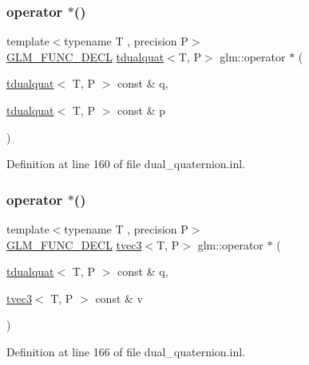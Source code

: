 \subsubsection{\texorpdfstring{operator $\ast$()}{operator *()}\hspace{0.1cm}{\footnotesize\ttfamily [1/7]}}
{\footnotesize\ttfamily template$<$typename T , precision P$>$ \\
\mbox{\hyperlink{setup_8hpp_ab2d052de21a70539923e9bcbf6e83a51}{G\+L\+M\+\_\+\+F\+U\+N\+C\+\_\+\+D\+E\+CL}} \mbox{\hyperlink{structglm_1_1tdualquat}{tdualquat}}$<$T, P$>$ glm\+::operator $\ast$ (\begin{DoxyParamCaption}\item[{\mbox{\hyperlink{structglm_1_1tdualquat}{tdualquat}}$<$ T, P $>$ const \&}]{q,  }\item[{\mbox{\hyperlink{structglm_1_1tdualquat}{tdualquat}}$<$ T, P $>$ const \&}]{p }\end{DoxyParamCaption})}



Definition at line 160 of file dual\+\_\+quaternion.\+inl.

\mbox{\label{group__gtx__dual__quaternion_gaf6c5a7a17854cbb1c8e6e34cc494f7af}} 
\subsubsection{\texorpdfstring{operator $\ast$()}{operator *()}\hspace{0.1cm}{\footnotesize\ttfamily [2/7]}}
{\footnotesize\ttfamily template$<$typename T , precision P$>$ \\
\mbox{\hyperlink{setup_8hpp_ab2d052de21a70539923e9bcbf6e83a51}{G\+L\+M\+\_\+\+F\+U\+N\+C\+\_\+\+D\+E\+CL}} \mbox{\hyperlink{structglm_1_1tvec3}{tvec3}}$<$T, P$>$ glm\+::operator $\ast$ (\begin{DoxyParamCaption}\item[{\mbox{\hyperlink{structglm_1_1tdualquat}{tdualquat}}$<$ T, P $>$ const \&}]{q,  }\item[{\mbox{\hyperlink{structglm_1_1tvec3}{tvec3}}$<$ T, P $>$ const \&}]{v }\end{DoxyParamCaption})}



Definition at line 166 of file dual\+\_\+quaternion.\+inl.

